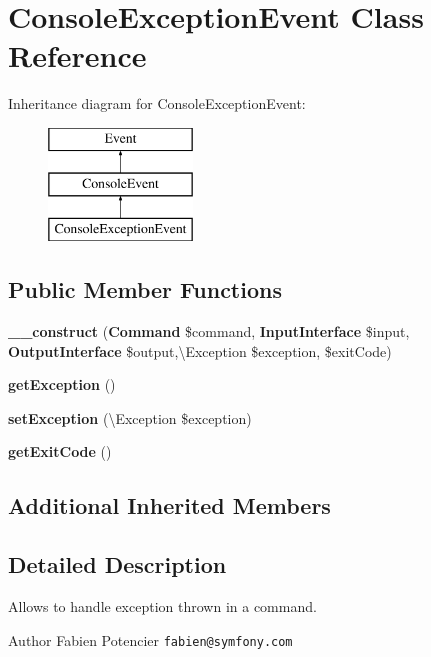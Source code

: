 \section{Console\+Exception\+Event Class Reference}
\label{class_symfony_1_1_component_1_1_console_1_1_event_1_1_console_exception_event}
Inheritance diagram for Console\+Exception\+Event\+:\begin{figure}[H]
\begin{center}
\leavevmode
\includegraphics[height=3.000000cm]{class_symfony_1_1_component_1_1_console_1_1_event_1_1_console_exception_event}
\end{center}
\end{figure}
\subsection*{Public Member Functions}
\begin{DoxyCompactItemize}
\item 
{\bf \+\_\+\+\_\+construct} ({\bf Command} \$command, {\bf Input\+Interface} \$input, {\bf Output\+Interface} \$output,\textbackslash{}Exception \$exception, \$exit\+Code)
\item 
{\bf get\+Exception} ()
\item 
{\bf set\+Exception} (\textbackslash{}Exception \$exception)
\item 
{\bf get\+Exit\+Code} ()
\end{DoxyCompactItemize}
\subsection*{Additional Inherited Members}


\subsection{Detailed Description}
Allows to handle exception thrown in a command.

\begin{DoxyAuthor}{Author}
Fabien Potencier {\tt fabien@symfony.\+com} 
\end{DoxyAuthor}


